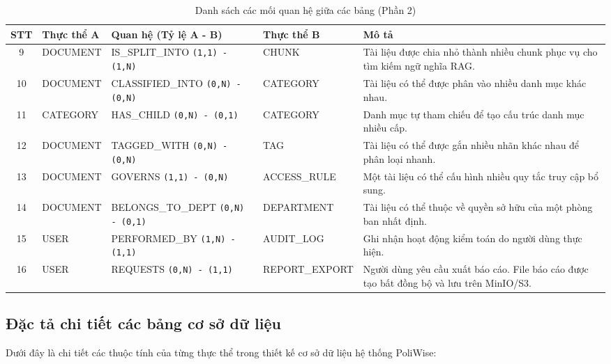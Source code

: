 \documentclass[12pt,a4paper]{report}
\begin{document}
\begin{table}[H]
\centering
\small
\caption{Danh sách các mối quan hệ giữa các bảng (Phần 2)}
\label{tab:relations_part2}
\begin{tabularx}{\textwidth}{|c|>{\hsize=0.8\hsize\raggedright\arraybackslash}X|>{\hsize=1.1\hsize\raggedright\arraybackslash}X|>{\hsize=0.8\hsize\raggedright\arraybackslash}X|>{\hsize=1.3\hsize\raggedright\arraybackslash}X|}
\hline
\rowcolor{gray!10}
STT & Thực thể A & Quan hệ (Tỷ lệ A - B) & Thực thể B & Mô tả \\ \hline
9 & DOCUMENT & IS\_\allowbreak SPLIT\_\allowbreak INTO \texttt{(1,1) - (1,N)} & CHUNK & Tài liệu được chia nhỏ thành nhiều chunk phục vụ cho tìm kiếm ngữ nghĩa RAG. \\ \hline
10 & DOCUMENT & CLASSIFIED\_\allowbreak INTO \texttt{(0,N) - (0,N)} & CATEGORY & Tài liệu có thể được phân vào nhiều danh mục khác nhau. \\ \hline
11 & CATEGORY & HAS\_\allowbreak CHILD \texttt{(0,N) - (0,1)} & CATEGORY & Danh mục tự tham chiếu để tạo cấu trúc danh mục nhiều cấp. \\ \hline
12 & DOCUMENT & TAGGED\_\allowbreak WITH \texttt{(0,N) - (0,N)} & TAG & Tài liệu có thể được gắn nhiều nhãn khác nhau để phân loại nhanh. \\ \hline
13 & DOCUMENT & GOVERNS \texttt{(1,1) - (0,N)} & ACCESS\_\allowbreak RULE & Một tài liệu có thể cấu hình nhiều quy tắc truy cập bổ sung. \\ \hline
14 & DOCUMENT & BELONGS\_\allowbreak TO\_\allowbreak DEPT \texttt{(0,N) - (0,1)} & DEPARTMENT & Tài liệu có thể thuộc về quyền sở hữu của một phòng ban nhất định. \\ \hline
15 & USER & PERFORMED\_\allowbreak BY \texttt{(1,N) - (1,1)} & AUDIT\_\allowbreak LOG & Ghi nhận hoạt động kiểm toán do người dùng thực hiện. \\ \hline
16 & USER & REQUESTS \texttt{(0,N) - (1,1)} & REPORT\_\allowbreak EXPORT & Người dùng yêu cầu xuất báo cáo. File báo cáo được tạo bất đồng bộ và lưu trên MinIO/S3. \\ \hline
\end{tabularx}
\end{table}

\subsection{Đặc tả chi tiết các bảng cơ sở dữ liệu}

Dưới đây là chi tiết các thuộc tính của từng thực thể trong thiết kế cơ sở dữ liệu hệ thống PoliWise:
\end{document}
